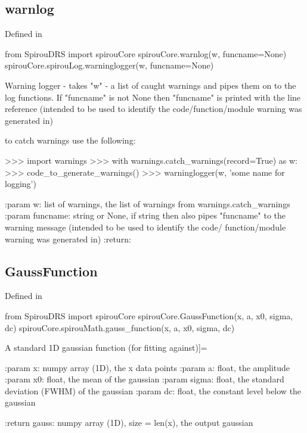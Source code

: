 \noindent\begin{minipage}{\textwidth}
\subsection{warnlog}

Defined in \spirouCore{}

\begin{pythonbox}
from SpirouDRS import spirouCore
spirouCore.warnlog(w, funcname=None)
spirouCore.spirouLog.warninglogger(w, funcname=None)
\end{pythonbox}

\begin{pythondocstring}
Warning logger - takes "w" - a list of caught warnings and pipes them on
to the log functions.
If "funcname" is not None then "funcname" is printed with the line reference
(intended to be used to identify the code/function/module warning was
generated in)

to catch warnings use the following:

>>> import warnings
>>> with warnings.catch_warnings(record=True) as w:
>>>     code_to_generate_warnings()
>>> warninglogger(w, 'some name for logging')

:param w: list of warnings, the list of warnings from
           warnings.catch_warnings
:param funcname: string or None, if string then also pipes "funcname" to the
                 warning message (intended to be used to identify the code/
                 function/module warning was generated in)
:return:
\end{pythondocstring}
\end{minipage}

\noindent\begin{minipage}{\textwidth}
\subsection{GaussFunction}

Defined in \spirouCore{}

\begin{pythonbox}
from SpirouDRS import spirouCore
spirouCore.GaussFunction(x, a, x0, sigma, dc)
spirouCore.spirouMath.gauss_function(x, a, x0, sigma, dc)
\end{pythonbox}

\begin{pythondocstring}
A standard 1D gaussian function (for fitting against)]=

:param x: numpy array (1D), the x data points
:param a: float, the amplitude
:param x0: float, the mean of the gaussian
:param sigma: float, the standard deviation (FWHM) of the gaussian
:param dc: float, the constant level below the gaussian

:return gauss: numpy array (1D), size = len(x), the output gaussian
\end{pythondocstring}
\end{minipage}

